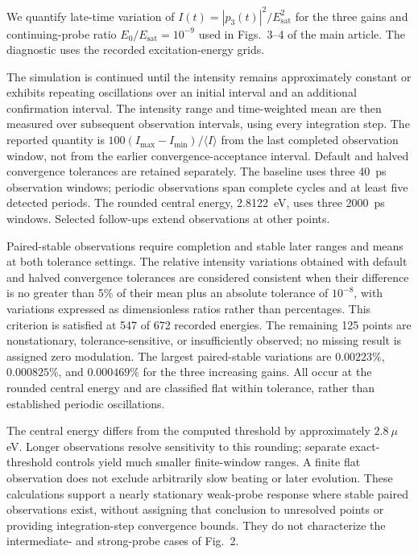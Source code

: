 \documentclass[9pt]{osa-supplemental-document}
\begin{document}
\begin{revision}
We quantify late-time variation of $I(t)=|p_3(t)|^2/E_{\mathrm{sat}}^2$ for the three gains and continuing-probe ratio $E_0/E_{\mathrm{sat}}=10^{-9}$ used in Figs.~3--4 of the main article. The diagnostic uses the recorded excitation-energy grids.

The simulation is continued until the intensity remains approximately constant or exhibits repeating oscillations over an initial interval and an additional confirmation interval. The intensity range and time-weighted mean are then measured over subsequent observation intervals, using every integration step. The reported quantity is $100(I_{\max}-I_{\min})/\langle I\rangle$ from the last completed observation window, not from the earlier convergence-acceptance interval. Default and halved convergence tolerances are retained separately. The baseline uses three 40~ps observation windows; periodic observations span complete cycles and at least five detected periods. The rounded central energy, 2.8122~eV, uses three 2000~ps windows. Selected follow-ups extend observations at other points.

Paired-stable observations require completion and stable later ranges and means at both tolerance settings. The relative intensity variations obtained with default and halved convergence tolerances are considered consistent when their difference is no greater than 5\% of their mean plus an absolute tolerance of $10^{-8}$, with variations expressed as dimensionless ratios rather than percentages. This criterion is satisfied at 547 of 672 recorded energies. The remaining 125 points are nonstationary, tolerance-sensitive, or insufficiently observed; no missing result is assigned zero modulation. The largest paired-stable variations are $0.00223\%$, $0.000825\%$, and $0.000469\%$ for the three increasing gains. All occur at the rounded central energy and are classified flat within tolerance, rather than established periodic oscillations.

The central energy differs from the computed threshold by approximately $2.8~\mu$eV. Longer observations resolve sensitivity to this rounding; separate exact-threshold controls yield much smaller finite-window ranges. A finite flat observation does not exclude arbitrarily slow beating or later evolution. These calculations support a nearly stationary weak-probe response where stable paired observations exist, without assigning that conclusion to unresolved points or providing integration-step convergence bounds. They do not characterize the intermediate- and strong-probe cases of Fig.~2.
\end{revision}
\end{document}
